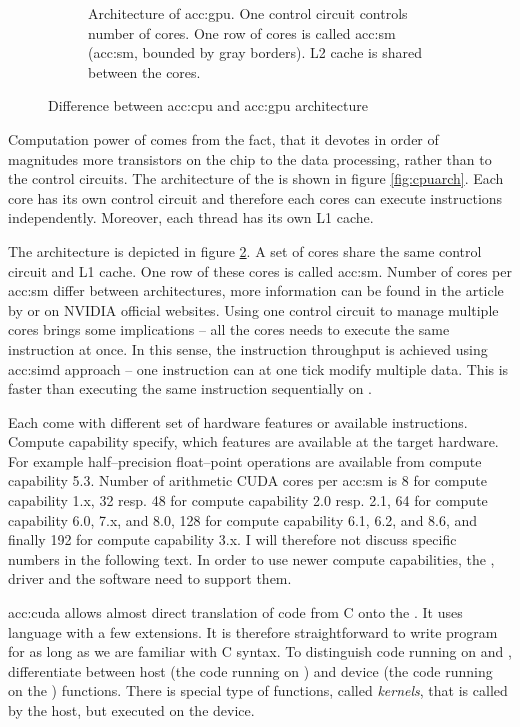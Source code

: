 \begin{figure}
\begin{subfigure}[t]{0.47\textwidth}
        \caption{Architecture of \acrshort*{acc:gpu}. One control circuit controls number of cores. One row of cores is called \acrlong{acc:sm} (\acrshort{acc:sm}, bounded by gray borders). L2 cache is shared between the cores.}
        \label{fig:gpuarch}
    \end{subfigure}
    \caption{Difference between \acrshort*{acc:cpu} and \acrshort*{acc:gpu} architecture}
\end{figure}

Computation power of \gpu comes from the fact, that it devotes in order of magnitudes more transistors on the chip to the data processing, rather than to the control circuits. The architecture of the \cpu is shown in figure \ref{fig:cpuarch}. Each core has its own control circuit and therefore each cores can execute instructions independently. Moreover, each thread has its own L1 cache.

The \gpu{} architecture is depicted in figure \ref{fig:gpuarch}. A set of cores share the same control circuit and L1 cache. One row of these cores is called \acrfull{acc:sm}. Number of cores per \acrshort{acc:sm} differ between architectures, more information can be found in the article by \citet{NVIDIAhistory} or on NVIDIA official websites. Using one control circuit to manage multiple cores brings some implications -- all the cores needs to execute the same instruction at once. In this sense, the instruction throughput is achieved using \acrfull{acc:simd} approach -- one instruction can at one tick modify multiple data. This is faster than executing the same instruction sequentially on \cpu.

Each \gpu come with different set of hardware features or available instructions. Compute capability specify, which features are available at the target hardware. For example half--precision float--point operations are available from compute capability 5.3. Number of arithmetic CUDA cores per \acrshort{acc:sm} is 8 for compute capability 1.x, 32 resp. 48 for compute capability 2.0 resp. 2.1, 64 for compute capability 6.0, 7.x, and 8.0, 128 for compute capability 6.1, 6.2, and 8.6, and finally 192 for compute capability 3.x. I will therefore not discuss specific numbers in the following text. In order to use newer compute capabilities, the \gpu, driver and the software need to support them.

\acrlong{acc:cuda} allows almost direct translation of code from C onto the \gpu. It uses \cpp language with a few extensions. It is therefore straightforward to write program for \gpu as long as we are familiar with C syntax. To distinguish code running on \cpu and \gpu, \cuda differentiate between host (the code running on \cpu) and device (the code running on the \gpu) functions. There is special type of functions, called \emph{kernels}, that is called by the host, but executed on the device.

